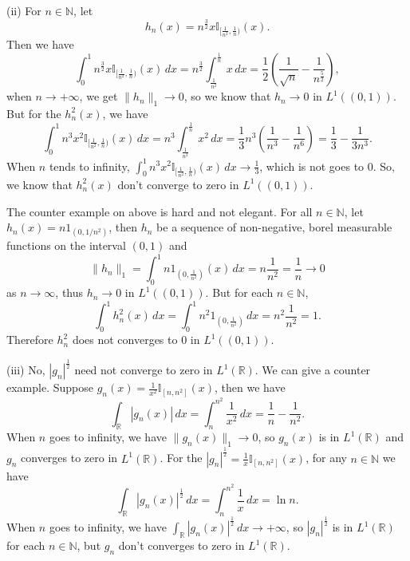 \documentclass[12pt,a4paper]{ctexart}
\begin{document}
(ii) For $n \in \mathbb{N}$, let
\begin{equation*}
   h_{n} (x) = n^{\frac{3}{2}} x \mathbb{I}_{[\frac{1}{n^{2}}, \frac{1}{n})} (x).
\end{equation*}
Then we have
\begin{equation*}
   \int_{0}^{1} n^{\frac{3}{2}} x \mathbb{I}_{[\frac{1}{n^{2}}, \frac{1}{n})} (x) \, d x  = n^{\frac{3}{2}} \int_{\frac{1}{n^{2}}}^{\frac{1}{n}} x \, d x  = \frac{1}{2} (\frac{1}{\sqrt{n}} - \frac{1}{n^{\frac{5}{2}}}),
\end{equation*}
when $n \to + \infty$, we get $\|h_{n} \|_{1} \to 0$, so we know that $h_{n} \to 0$ in $L^{1}((0, 1))$. But for the $h_{n}^{2}(x)$, we have
\begin{equation*}
   \int_{0}^{1} n^{3} x^{2} \mathbb{I}_{[\frac{1}{n^{2}}, \frac{1}{n})} (x) \, d x  = n^{3} \int_{\frac{1}{n^{2}}}^{\frac{1}{n}} x^{2} \, d x  = \frac{1}{3} n^{3} (\frac{1}{n^{3}} - \frac{1}{n^{6}}) = \frac{1}{3} - \frac{1}{3 n^{3}}.
\end{equation*}
When $n$ tends to infinity, $\int_{0}^{1} n^{3} x^{2} \mathbb{I}_{[\frac{1}{n^{2}}, \frac{1}{n})} (x) \, d x \rightarrow \frac{1}{3}$, which is not goes to $0$. So, we know that $h_{n}^{2}(x)$ don't converge to zero in $L^{1}((0, 1))$. 

The counter example on above is hard and not elegant. For all $n \in \mathbb N$, let $h_n(x) = n 1_{(0, 1/n^2)} $, then $h_{n}$ be a sequence of non-negative, borel measurable functions on the interval $(0, 1)$ and
$$\|h_n\|_1 = \int_{0}^{1} n 1_{(0, \frac{1}{n^2})} (x) \, d x = n \frac{1}{n^2} = \frac{1}{n} \to 0$$
as $n \to \infty$, thus $h_n \to 0$ in $L^1((0,1))$. But for each $n \in \mathbb N$,
$$\int_{0}^{1} h_n^2 (x) \, d x = \int_{0}^{1} n^2 1_{(0, \frac{1}{n^2})} \, d x = n^2 \frac{1}{n^2} = 1.$$
Therefore $h_n^2$ does not converges to $0$ in $L^1((0,1))$.

(iii) No, $|g_{n}|^{\frac{1}{2}}$ need not converge to zero in $L^{1}(\mathbb{R})$. We can give a counter example. Suppose $g_{n}(x) = \frac{1}{x^{2}} \mathbb{I}_{[n, n^{2}]} (x)$, then we have
\begin{equation*}
   \int_{\mathbb{R}}^{} |g_{n}(x)| \, d x  = \int_{n}^{n^{2}} \frac{1}{x^{2}} \, d x  = \frac{1}{n} - \frac{1}{n^{2}}.
\end{equation*}
When $n$ goes to infinity, we have $\|g_{n}(x) \|_{1} \to 0$, so $g_{n} (x)$ is in $L^{1}(\mathbb{R})$ and $g_{n}$ converges to zero in $L^{1}(\mathbb{R})$. For the $|g_{n}|^{\frac{1}{2}} = \frac{1}{x} \mathbb{I}_{[n, n^{2}]} (x)$, for any $n \in \mathbb{N}$ we have 
\begin{equation*}
   \int_{\mathbb{R}}^{} |g_{n}(x)|^{\frac{1}{2}} \, d x  = \int_{n}^{n^{2}} \frac{1}{x} \, d x  = \ln n.
\end{equation*}
When $n$ goes to infinity, we have $\int_{\mathbb{R}}^{} |g_{n}(x)|^{\frac{1}{2}} \, d x \to + \infty$, so $|g_{n}|^{\frac{1}{2}}$ is in $L^{1}(\mathbb{R})$ for each $n \in \mathbb N$, but $g_{n}$ don't converges to zero in $L^{1}(\mathbb{R})$.
\end{document}
